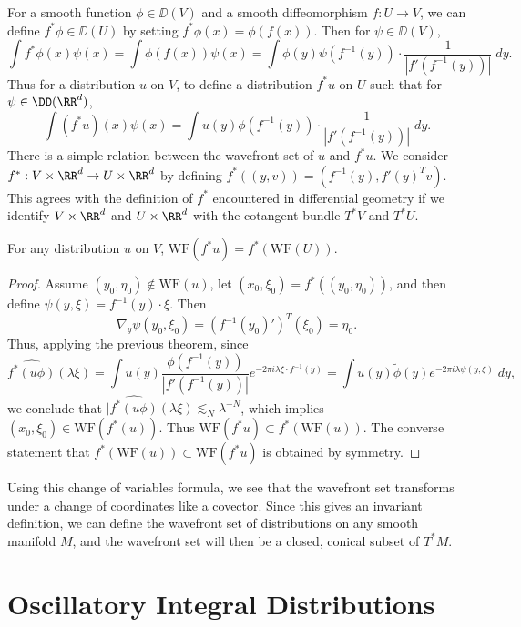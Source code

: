 For a smooth function $\phi \in \DD(V)$ and a smooth diffeomorphism $f: U \to V$, we can define $f^* \phi \in \DD(U)$ by setting $f^* \phi(x) = \phi(f(x))$. Then for $\psi \in \DD(V)$,
%
\[ \int f^* \phi(x) \psi(x) = \int \phi(f(x)) \psi(x) = \int \phi(y) \psi(f^{-1}(y)) \cdot \frac{1}{|f'(f^{-1}(y))|} \; dy. \]
%
Thus for a distribution $u$ on $V$, to define a distribution $f^* u$ on $U$ such that for $\psi \in \DD(\RR^d)$,
%
\[ \int (f^* u)(x) \psi(x) = \int u(y) \phi(f^{-1}(y)) \cdot \frac{1}{|f'(f^{-1}(y))|}\; dy. \]
%
There is a simple relation between the wavefront set of $u$ and $f^* u$. We consider $f^*: V \times \RR^d \to U \times \RR^d$ by defining $f^*((y,v)) = (f^{-1}(y), f'(y)^T v)$. This agrees with the definition of $f^*$ encountered in differential geometry if we identify $V \times \RR^d$ and $U \times \RR^d$ with the cotangent bundle $T^* V$ and $T^* U$.

\begin{theorem}
    For any distribution $u$ on $V$, $\text{WF}(f^* u) = f^*(\text{WF}(U))$.
\end{theorem}
\begin{proof}
    Assume $(y_0,\eta_0) \not \in \text{WF}(u)$, let $(x_0,\xi_0) = f^*((y_0,\eta_0))$, and then define $\psi(y,\xi) = f^{-1}(y) \cdot \xi$. Then
    \[ \nabla_y \psi(y_0,\xi_0) = (f^{-1}(y_0)')^T(\xi_0) = \eta_0. \]
    Thus, applying the previous theorem, since
    \[ \widehat{f^*(u \phi)}(\lambda \xi) = \int u(y) \frac{\phi(f^{-1}(y))}{|f'(f^{-1}(y))|} e^{-2 \pi i \lambda \xi \cdot f^{-1}(y)} = \int u(y) \tilde{\phi}(y) e^{-2 \pi i \lambda \psi(y,\xi)}\; dy, \]
    we conclude that $|\widehat{f^*(u \phi)}(\lambda \xi) \lesssim_N \lambda^{-N}$, which implies $(x_0,\xi_0) \in \text{WF}(f^*(u))$. Thus $\text{WF}(f^* u) \subset f^*(\text{WF}(u))$. The converse statement that $f^*(\text{WF}(u)) \subset \text{WF}(f^* u)$ is obtained by symmetry.
\end{proof}

Using this change of variables formula, we see that the wavefront set transforms under a change of coordinates like a covector. Since this gives an invariant definition, we can define the wavefront set of distributions on any smooth manifold $M$, and the wavefront set will then be a closed, conical subset of $T^* M$.

\section{Oscillatory Integral Distributions}

